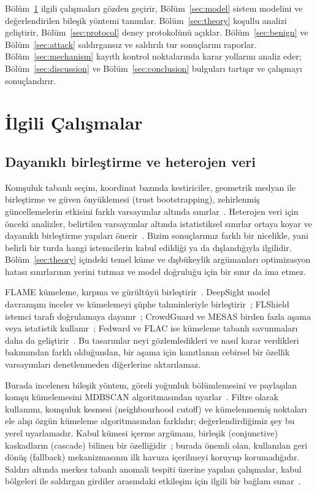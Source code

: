 \documentclass[journal]{IEEEtran}
\begin{document}
Bölüm~\ref{sec:related} ilgili çalışmaları gözden geçirir, Bölüm~\ref{sec:model} sistem modelini ve değerlendirilen bileşik yöntemi tanımlar. Bölüm~\ref{sec:theory} koşullu analizi geliştirir, Bölüm~\ref{sec:protocol} deney protokolünü açıklar. Bölüm~\ref{sec:benign} ve Bölüm~\ref{sec:attack} saldırgansız ve saldırılı tur sonuçlarını raporlar. Bölüm~\ref{sec:mechanism} kayıtlı kontrol noktalarında karar yollarını analiz eder; Bölüm~\ref{sec:discussion} ve Bölüm~\ref{sec:conclusion} bulguları tartışır ve çalışmayı sonuçlandırır.

\section{İlgili Çalışmalar}\label{sec:related}
\subsection{Dayanıklı birleştirme ve heterojen veri}
Komşuluk tabanlı seçim, koordinat bazında kestiriciler, geometrik medyan ile birleştirme ve güven önyüklemesi (trust bootstrapping), zehirlenmiş güncellemelerin etkisini farklı varsayımlar altında sınırlar~\cite{blanchard2017,yin2018,pillutla2022rfa,cao2021fltrust}. Heterojen veri için önceki analizler, belirtilen varsayımlar altında istatistiksel sınırlar ortaya koyar ve dayanıklı birleştirme yapıları önerir~\cite{karimireddy2022bucketing,allouah2023mixing}. Bizim sonuçlarımız farklı bir nicelikle, yani belirli bir turda hangi istemcilerin kabul edildiği ya da dışlandığıyla ilgilidir. Bölüm~\ref{sec:theory} içindeki temel küme ve dışbükeylik argümanları optimizasyon hatası sınırlarının yerini tutmaz ve model doğruluğu için bir sınır da ima etmez.

FLAME kümeleme, kırpma ve gürültüyü birleştirir~\cite{nguyen2022flame}. DeepSight model davranışını inceler ve kümelemeyi şüphe tahminleriyle birleştirir~\cite{rieger2022deepsight}; FLShield istemci tarafı doğrulamaya dayanır~\cite{kabir2023flshield}; CrowdGuard ve MESAS birden fazla aşama veya istatistik kullanır~\cite{rieger2024crowdguard,krauss2023mesas}; Fedward ve FLAC ise kümeleme tabanlı savunmaları daha da geliştirir~\cite{chen2023fedward,yuan2025flac}. Bu tasarımlar neyi gözlemledikleri ve nasıl karar verdikleri bakımından farklı olduğundan, bir aşama için kanıtlanan cebirsel bir özellik varsayımları denetlenmeden diğerlerine aktarılamaz.

Burada incelenen bileşik yöntem, göreli yoğunluk bölümlemesini ve paylaşılan komşu kümelemesini MDBSCAN algoritmasından uyarlar~\cite{qian2024mdbscan}. Filtre olarak kullanımı, komşuluk kesmesi (neighbourhood cutoff) ve kümelenmemiş noktaları ele alışı özgün kümeleme algoritmasından farklıdır; değerlendirdiğimiz şey bu yerel uyarlamadır. Kabul kümesi içerme argümanı, birleşik (conjunctive) kaskadların (cascade) bilinen bir özelliğidir~\cite{viola2004cascade}; burada önemli olan, kullanılan geri dönüş (fallback) mekanizmasının ilk havuza içerilmeyi koruyup korumadığıdır. Saldırı altında merkez tabanlı anomali tespiti üzerine yapılan çalışmalar, kabul bölgeleri ile saldırgan girdiler arasındaki etkileşim için ilgili bir bağlam sunar~\cite{kloft2012centroid}.
\end{document}
